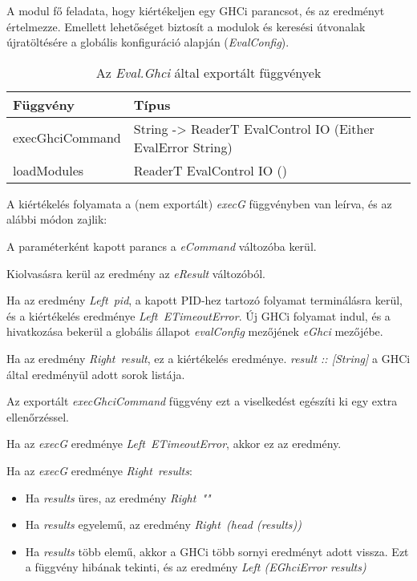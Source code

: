 A modul fő feladata, hogy kiértékeljen egy GHCi parancsot, és az eredményt értelmezze. Emellett lehetőséget biztosít a modulok és keresési útvonalak újratöltésére a globális konfiguráció alapján (\textit{EvalConfig}).

\begin{table}
	\centering
	\begin{tabularx}{\textwidth}{ |X|X|}
		\hline
		Függvény & Típus \\
		\hline\hline
		execGhciCommand & String -> ReaderT EvalControl IO (Either EvalError String) \\
		\hline
		loadModules & ReaderT EvalControl IO () \\
		\hline
	\end{tabularx}
	\caption[Az \textit{Eval.Ghci} által exportált függvények]{Az \textit{Eval.Ghci} által exportált függvények}
	\label{tab:interface}
\end{table}

A kiértékelés folyamata a (nem exportált) \textit{execG} függvényben van leírva, és az alábbi módon zajlik:
\begin{compactenum}
	\item A paraméterként kapott parancs a \textit{eCommand} változóba kerül.
	\item Kiolvasásra kerül az eredmény az \textit{eResult} változóból.
	\item Ha az eredmény \textit{Left\ pid}, a kapott PID-hez tartozó folyamat terminálásra kerül, és a kiértékelés eredménye \textit{Left\ ETimeoutError}. Új GHCi folyamat indul, és a hivatkozása bekerül a globális állapot \textit{evalConfig} mezőjének \textit{eGhci} mezőjébe.
	\item Ha az eredmény \textit{Right\ result}, ez a kiértékelés eredménye. \textit{result :: [String]} a GHCi által eredményül adott sorok listája.
\end{compactenum}

Az exportált \textit{execGhciCommand} függvény ezt a viselkedést egészíti ki egy extra ellenőrzéssel.
\begin{compactenum}
	\item Ha az \textit{execG} eredménye \textit{Left\ ETimeoutError}, akkor ez az eredmény.
	\item Ha az \textit{execG} eredménye \textit{Right\ results}:
	\begin{itemize}
		\item Ha \textit{results} üres, az eredmény \textit{Right\ ""}
		\item Ha \textit{results} egyelemű, az eredmény \textit{Right\ (head (results))}
		\item Ha \textit{results} több elemű, akkor a GHCi több sornyi eredményt adott vissza. Ezt a függvény hibának tekinti, és az eredmény \textit{Left (EGhciError results)}
	\end{itemize}
\end{compactenum}

